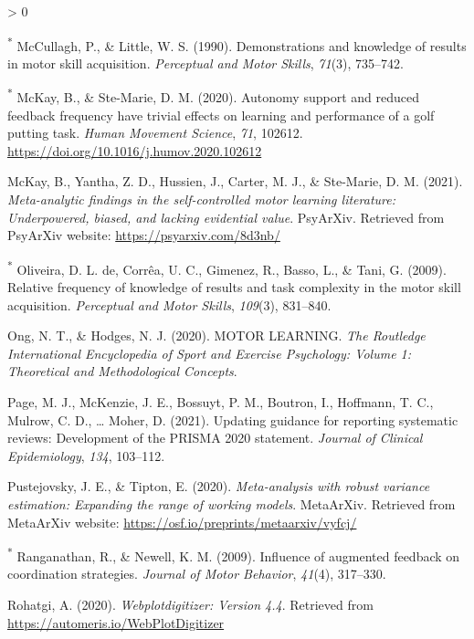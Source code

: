 \documentclass[
  english,
  man, donotrepeattitle,floatsintext]{apa7}
\newlength{\cslhangindent}
\newenvironment{CSLReferences}[2] %
 {%
  \setlength{\parindent}{0pt}
  \ifodd #1 \everypar{\setlength{\hangindent}{\cslhangindent}}\ignorespaces\fi
  \ifnum #2 > 0
  \setlength{\parskip}{#2\baselineskip}
  \fi
 }%
 {}
\begin{document}
\begin{CSLReferences}{1}{0}
\leavevmode\hypertarget{ref-McCullagh1990}{}%
\textsuperscript{*} McCullagh, P., \& Little, W. S. (1990). Demonstrations and knowledge of results in motor skill acquisition. \emph{Perceptual and Motor Skills}, \emph{71}(3), 735--742.

\leavevmode\hypertarget{ref-McKay2020}{}%
\textsuperscript{*} McKay, B., \& Ste-Marie, D. M. (2020). Autonomy support and reduced feedback frequency have trivial effects on learning and performance of a golf putting task. \emph{Human Movement Science}, \emph{71}, 102612. \url{https://doi.org/10.1016/j.humov.2020.102612}

\leavevmode\hypertarget{ref-McKay2021}{}%
McKay, B., Yantha, Z. D., Hussien, J., Carter, M. J., \& Ste-Marie, D. M. (2021). \emph{Meta-analytic findings in the self-controlled motor learning literature: Underpowered, biased, and lacking evidential value}. PsyArXiv. Retrieved from PsyArXiv website: \url{https://psyarxiv.com/8d3nb/}

\leavevmode\hypertarget{ref-Oliveira2009}{}%
\textsuperscript{*} Oliveira, D. L. de, Corrêa, U. C., Gimenez, R., Basso, L., \& Tani, G. (2009). Relative frequency of knowledge of results and task complexity in the motor skill acquisition. \emph{Perceptual and Motor Skills}, \emph{109}(3), 831--840.

\leavevmode\hypertarget{ref-Ong2020}{}%
Ong, N. T., \& Hodges, N. J. (2020). MOTOR LEARNING. \emph{The Routledge International Encyclopedia of Sport and Exercise Psychology: Volume 1: Theoretical and Methodological Concepts}.

\leavevmode\hypertarget{ref-Page2021}{}%
Page, M. J., McKenzie, J. E., Bossuyt, P. M., Boutron, I., Hoffmann, T. C., Mulrow, C. D., \ldots{} Moher, D. (2021). Updating guidance for reporting systematic reviews: Development of the PRISMA 2020 statement. \emph{Journal of Clinical Epidemiology}, \emph{134}, 103--112.

\leavevmode\hypertarget{ref-Pustejovsky2020}{}%
Pustejovsky, J. E., \& Tipton, E. (2020). \emph{Meta-analysis with robust variance estimation: Expanding the range of working models}. MetaArXiv. Retrieved from MetaArXiv website: \url{https://osf.io/preprints/metaarxiv/vyfcj/}

\leavevmode\hypertarget{ref-Ranganathan2009}{}%
\textsuperscript{*} Ranganathan, R., \& Newell, K. M. (2009). Influence of augmented feedback on coordination strategies. \emph{Journal of Motor Behavior}, \emph{41}(4), 317--330.

\leavevmode\hypertarget{ref-Rohatgi2020}{}%
Rohatgi, A. (2020). \emph{Webplotdigitizer: Version 4.4}. Retrieved from \url{https://automeris.io/WebPlotDigitizer}


\end{CSLReferences}
\end{document}
